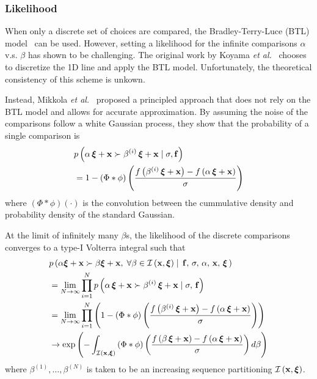\subsubsection{Likelihood}
When only a discrete set of choices are compared, the Bradley-Terry-Luce (BTL) model~\cite{10.1145/3072959.3073598} can be used.
However, setting a likelihood for the infinite comparisons \(\alpha\) v.s. \(\beta\) has shown to be challenging.
The original work by Koyama \textit{et al.}~\cite{koyama_sequential_2020} chooses to discretize the 1D line and apply the BTL model.
Unfortunately, the theoretical consistency of this scheme is unkown.

Instead, Mikkola \textit{et al.}~\cite{pmlr-v119-mikkola20a} proposed a principled approach that does not rely on the BTL model and allows for accurate approximation.
By assuming the noise of the comparisons follow a white Gaussian process, they show that the probability of a single comparison is
\begin{align}
  &p\left(\alpha \, \bm{\xi} + \mathbf{x} \succ \beta^{(i)} \, \bm{\xi} + \mathbf{x} \mid \sigma, \mathbf{f} \right) \nonumber\\
  &= 1 - \left(\Phi * \phi \right)\left( \frac{ f\left(\beta^{(i)} \, \bm{\xi} + \mathbf{x} \right) - f\left(\alpha \, \bm{\xi} + \mathbf{x} \right) }{\sigma} \right)
\end{align}
{\noindent}where \(\left(\Phi*\phi\right)\left(\cdot\right)\) is the convolution between the cummulative density and probability density of the standard Gaussian. 

At the limit of infinitely many \(\beta\)s, the likelihood of the discrete comparisons converges to a type-I Volterra integral such that
{\small
\begin{align}
  &p\left(\alpha \bm{\xi} + \mathbf{x} \succ \beta \bm{\xi} + \mathbf{x},\; \forall \beta \in \mathcal{I}\left(\mathbf{x}, \bm{\xi}\right) \mid\, \mathbf{f},\, \sigma,\, \alpha,\, \mathbf{x},\, \bm{\xi}\,\right) \nonumber \\
  &= \lim_{N \rightarrow \infty} \prod^{N}_{i=1} p\left(\alpha \, \bm{\xi} + \mathbf{x} \succ \beta^{(i)} \, \bm{\xi} + \mathbf{x} \mid \sigma,\, \mathbf{f} \right) \\
  &= \lim_{N \rightarrow \infty} \prod^{N}_{i=1} \left(  1 - \left(\Phi * \phi \right)\left( \frac{ f\left(\beta^{(i)} \, \bm{\xi} + \mathbf{x} \right) - f\left(\alpha \, \bm{\xi} + \mathbf{x} \right) }{\sigma} \right) \right) \\
  &\rightarrow \exp\left(  - \int_{\mathcal{I}\left(\mathbf{x}, \bm{\xi}\right)} \left(\Phi * \phi \right) \left( \frac{ f\left(\beta \, \bm{\xi} + \mathbf{x} \right) - f\left(\alpha \, \bm{\xi} + \mathbf{x} \right) }{\sigma} \right) d\beta \right)
\end{align}
}%
%
{\noindent}where \(\beta^{(1)}, \ldots, \beta^{(N)}\) is taken to be an increasing sequence partitioning \(\mathcal{I\left(\mathbf{x}, \bm{\xi}\right)}\).

